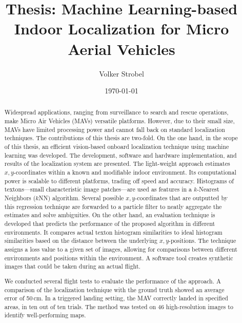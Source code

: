 \documentclass{report}
\title{Thesis: Machine Learning-based Indoor Localization for Micro
  Aerial Vehicles}
\author{Volker Strobel}
\date{\today}
\begin{document}
\maketitle

\begin{abstract}
  Widespread applications, ranging from surveillance to search and
  rescue operations, make Micro Air Vehicles (MAVs) versatile
  platforms.  However, due to their small size, MAVs have limited
  processing power and cannot fall back on standard localization
  techniques. %
  The contributions of this thesis are two-fold. On the one hand, in
  the scope of this thesis, an efficient vision-based onboard
  localization technique using machine learning was developed. The
  development, software and hardware implementation, and results of
  the localization system are presented. The light-weight approach
  estimates $x,y$-coordinates within a known and modifiable indoor
  environment. Its computational power is scalable to different
  platforms, trading off speed and accuracy. Histograms of
  textons---small characteristic image patches---are used as features
  in a $k$-Nearest Neighbors ($k$NN) algorithm. Several possible
  $x,y$-coordinates that are outputted by this regression technique
  are forwarded to a particle filter to neatly aggregate the estimates
  and solve ambiguities.
  On the other hand, an evaluation technique is developed that
  predicts the performance of the proposed algorithm in different
  environments. It compares actual texton histogram similarities to
  ideal histogram similarities based on the distance between the
  underlying $x,y$-positions. The technique assigns a loss value to a
  given set of images, allowing for comparisons between different
  environments and positions within the environment. A software tool
  creates synthetic images that could be taken during an actual
  flight.


  We conducted several flight tests to evaluate the performance of the
  approach. A comparison of the localization technique with the ground
  truth showed an average error of 50\,cm. In a triggered landing
  setting, the MAV correctly landed in specified areas, in ten out of
  ten trials. The method was tested on 46 high-resolution images to
  identify well-performing maps.


\end{abstract}
\end{document}
